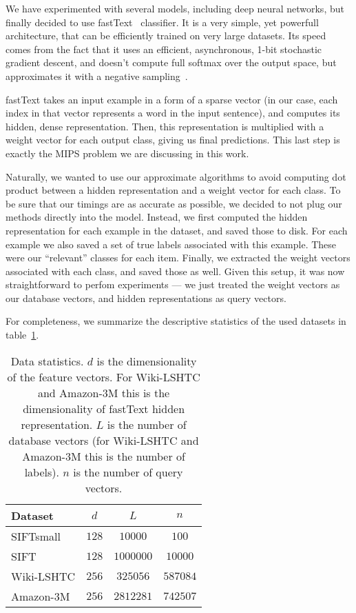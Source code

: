         We have experimented with several models, including deep neural networks, but finally decided to
        use fastText~\cite{fasttext} classifier. It is a very simple, yet powerfull architecture, that
        can be efficiently trained on very large datasets. Its speed comes from the fact that it uses an efficient,
        asynchronous, 1-bit stochastic gradient descent, and doesn't compute full softmax over the output space,
        but approximates it with a negative sampling~\cite{w2v}.

        fastText takes an input example in a form of a sparse vector (in our case, each index in that vector
        represents a word in the input sentence), and computes its hidden, dense representation. Then, this
        representation is multiplied with a weight vector for each output class, giving us final predictions.
        This last step is exactly the MIPS problem we are discussing in this work.

        Naturally, we wanted to use our approximate algorithms to avoid computing dot product between a hidden
        representation and a weight vector for each class. To be sure that our timings are as accurate as possible,
        we decided to not plug our methods directly into the model. Instead, we first computed the hidden representation
        for each example in the dataset, and saved those to disk. For each example we also saved a set of
        true labels associated with this example. These were our ``relevant'' classes for each item.
        Finally, we extracted the weight vectors associated with each class, and saved those as well. Given this setup,
        it was now straightforward to perfom experiments --- we just treated the weight vectors as our database vectors,
        and hidden representations as query vectors.

        For completeness, we summarize the descriptive statistics of the used datasets in table~\ref{tab:dsz}.

        \begin{table}
          \caption{Data statistics. $d$ is the dimensionality of the feature vectors. For Wiki-LSHTC and Amazon-3M this
          is the dimensionality of fastText hidden representation. $L$ is the number
          of database vectors (for Wiki-LSHTC and Amazon-3M this is the number of labels). $n$ is the number of query vectors.}
          \label{tab:dsz}
          \centering
          {
          \begin{tabular}{l|c|c|c|}
            Dataset & $d$ &$L$& $n$ \\
            \hline
            SIFTsmall   & $128$ & $10000$   & $100$    \\
            SIFT        & $128$ & $1000000$ & $10000$  \\
            Wiki-LSHTC  & $256$ & $325056$  & $587084$ \\
            Amazon-3M   & $256$ & $2812281$ & $742507$ \\
          \end{tabular}
          }
        \end{table}

